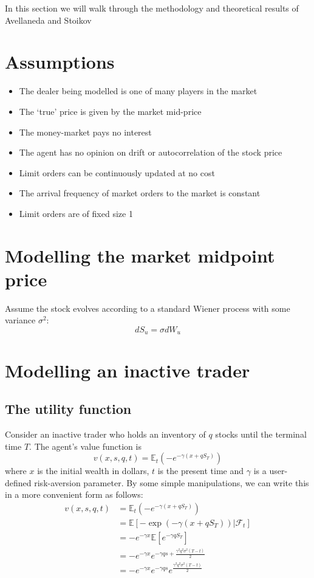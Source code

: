 In this section we will walk through the methodology and theoretical
results of Avellaneda and Stoikov \cite{as}

\section{Assumptions}

\begin{itemize}
    \item The dealer being modelled is one of many players in the market
    \item The `true' price is given by the market mid-price
    \item The money-market pays no interest
    \item The agent has no opinion on drift or autocorrelation of the stock price
    \item Limit orders can be continuously updated at no cost
    \item The arrival frequency of market orders to the market is constant
    \item Limit orders are of fixed size 1
\end{itemize}

\section{Modelling the market midpoint price}
Assume the stock evolves according to a standard Wiener process with some variance $\sigma^2$: 
$$dS_u=\sigma dW_u$$

\section{Modelling an inactive trader}
\subsection{The utility function}

Consider an inactive trader who holds an inventory of $q$ stocks until the terminal time $T.$ The agent's value function is
$$v(x,s,q,t)=\mathbb{E}_t\left(-e^{-\gamma(x+qS_T)}\right)$$
where $x$ is the initial wealth in dollars, $t$ is the present time and $\gamma$ is a user-defined risk-aversion parameter.
By some simple manipulations, we can write this in a more convenient form as follows:
\begin{align*}
    v(x,s,q,t)&=\mathbb{E}_t\left(-e^{-\gamma(x+qS_T)}\right)\\
    &=\mathbb{E}\left[-\exp(-\gamma(x+qS_T))|\mathcal{F}_t\right]\\
    &=-e^{-\gamma x}\mathbb{E}\left[e^{-\gamma q S_T}\right]\\
    &=-e^{-\gamma x}e^{-\gamma q s + \frac{\gamma^2q^2\sigma^2(T-t)}{2}}\\
    &=-e^{-\gamma x}e^{-\gamma q s}e^{\frac{\gamma^2q^2\sigma^2(T-t)}{2}}
\end{align*}

